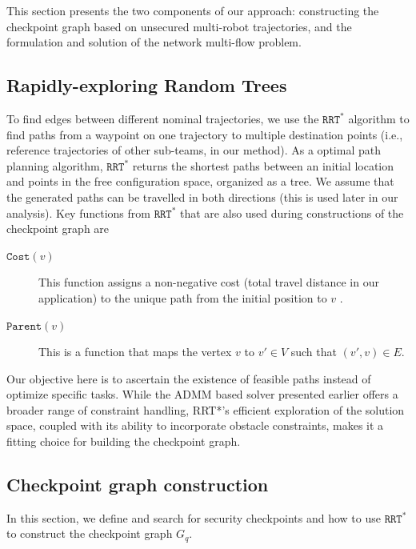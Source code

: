 \documentclass[10pt,twocolumn,twoside]{IEEEtran}
\newcommand{\rrtstar}{$\texttt{RRT}^\texttt{*}$}
\begin{document}
This section presents the two components of our approach: constructing the checkpoint graph based on unsecured multi-robot trajectories, and the formulation and solution of the network multi-flow problem.

\subsection{Rapidly-exploring Random Trees}
To find edges between different nominal trajectories, we use the \rrtstar{} \cite{karaman2010incremental} algorithm to find paths from a waypoint on one trajectory to multiple destination points (i.e., reference trajectories of other sub-teams, in our method). As a optimal path planning algorithm, \rrtstar{} returns the shortest paths between an initial location and points in the free configuration space, organized as a tree. We assume that the generated paths can be travelled in both directions (this is used later in our analysis). 
Key functions from \rrtstar{} that are also used during constructions of the checkpoint graph are
\begin{description}
\item[$\texttt{Cost}(v)$] This function assigns a non-negative cost (total travel distance in our application) to the unique path from the initial position to $v$ . 
\item[$\texttt{Parent}(v)$] This is a function that maps the vertex $v$ to $v'\in V$ such that $(v',v)\in E$.
\end{description}

Our objective here is to ascertain the existence of feasible paths instead of optimize specific tasks. While the ADMM based solver  presented earlier offers a broader range of constraint handling, RRT*'s efficient exploration of the solution space, coupled with its ability to incorporate obstacle constraints, makes it a fitting choice for building the checkpoint graph.

\subsection{Checkpoint graph construction}

In this section, we define and search for security checkpoints and how to use \rrtstar{} to construct the checkpoint graph $G_{q}$.
\end{document}

